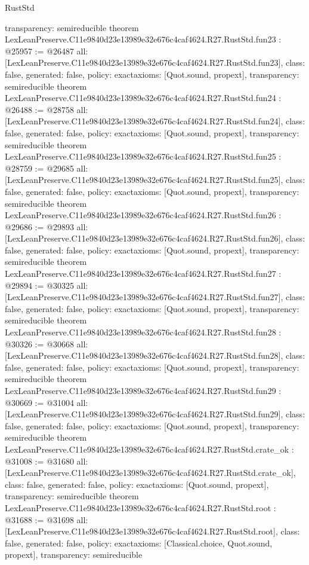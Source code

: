 \begin{lexlean}{RustStd}
\begin{coremodule}
{  transparency: semireducible
}
theorem LexLeanPreserve.C11e9840d23e13989e32e676c4caf4624.R27.RustStd.fun23 : @25957 := @26487 {
  all: [LexLeanPreserve.C11e9840d23e13989e32e676c4caf4624.R27.RustStd.fun23],
  class: false,
  generated: false,
  policy: exact{axioms: [Quot.sound, propext]},
  transparency: semireducible
}
theorem LexLeanPreserve.C11e9840d23e13989e32e676c4caf4624.R27.RustStd.fun24 : @26488 := @28758 {
  all: [LexLeanPreserve.C11e9840d23e13989e32e676c4caf4624.R27.RustStd.fun24],
  class: false,
  generated: false,
  policy: exact{axioms: [Quot.sound, propext]},
  transparency: semireducible
}
theorem LexLeanPreserve.C11e9840d23e13989e32e676c4caf4624.R27.RustStd.fun25 : @28759 := @29685 {
  all: [LexLeanPreserve.C11e9840d23e13989e32e676c4caf4624.R27.RustStd.fun25],
  class: false,
  generated: false,
  policy: exact{axioms: [Quot.sound, propext]},
  transparency: semireducible
}
theorem LexLeanPreserve.C11e9840d23e13989e32e676c4caf4624.R27.RustStd.fun26 : @29686 := @29893 {
  all: [LexLeanPreserve.C11e9840d23e13989e32e676c4caf4624.R27.RustStd.fun26],
  class: false,
  generated: false,
  policy: exact{axioms: [Quot.sound, propext]},
  transparency: semireducible
}
theorem LexLeanPreserve.C11e9840d23e13989e32e676c4caf4624.R27.RustStd.fun27 : @29894 := @30325 {
  all: [LexLeanPreserve.C11e9840d23e13989e32e676c4caf4624.R27.RustStd.fun27],
  class: false,
  generated: false,
  policy: exact{axioms: [Quot.sound, propext]},
  transparency: semireducible
}
theorem LexLeanPreserve.C11e9840d23e13989e32e676c4caf4624.R27.RustStd.fun28 : @30326 := @30668 {
  all: [LexLeanPreserve.C11e9840d23e13989e32e676c4caf4624.R27.RustStd.fun28],
  class: false,
  generated: false,
  policy: exact{axioms: [Quot.sound, propext]},
  transparency: semireducible
}
theorem LexLeanPreserve.C11e9840d23e13989e32e676c4caf4624.R27.RustStd.fun29 : @30669 := @31004 {
  all: [LexLeanPreserve.C11e9840d23e13989e32e676c4caf4624.R27.RustStd.fun29],
  class: false,
  generated: false,
  policy: exact{axioms: [Quot.sound, propext]},
  transparency: semireducible
}
theorem LexLeanPreserve.C11e9840d23e13989e32e676c4caf4624.R27.RustStd.crate_ok : @31008 := @31680 {
  all: [LexLeanPreserve.C11e9840d23e13989e32e676c4caf4624.R27.RustStd.crate_ok],
  class: false,
  generated: false,
  policy: exact{axioms: [Quot.sound, propext]},
  transparency: semireducible
}
theorem LexLeanPreserve.C11e9840d23e13989e32e676c4caf4624.R27.RustStd.root : @31688 := @31698 {
  all: [LexLeanPreserve.C11e9840d23e13989e32e676c4caf4624.R27.RustStd.root],
  class: false,
  generated: false,
  policy: exact{axioms: [Classical.choice, Quot.sound, propext]},
  transparency: semireducible
}


\end{coremodule}
\end{lexlean}

